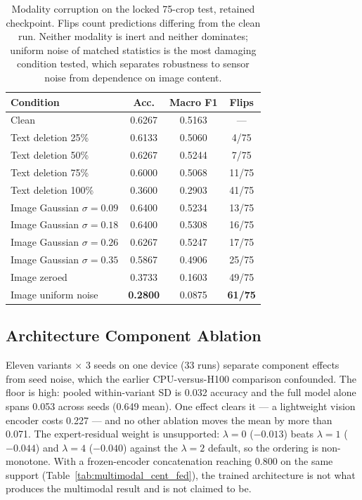 \documentclass[conference]{IEEEtran}
\begin{document}
\begin{table}[t]
\caption{Modality corruption on the locked 75-crop test, retained checkpoint. Flips count predictions differing from the clean run. Neither modality is inert and neither dominates; uniform noise of matched statistics is the most damaging condition tested, which separates robustness to sensor noise from dependence on image content.}
\label{tab:corruption}
\centering\footnotesize
\setlength\tabcolsep{4pt}
\begin{tabular}{lccc}
\toprule
\textbf{Condition} & \textbf{Acc.} & \textbf{Macro F1} & \textbf{Flips}\\
\midrule
Clean & 0.6267 & 0.5163 & ---\\
\midrule
Text deletion 25\% & 0.6133 & 0.5060 & 4/75\\
Text deletion 50\% & 0.6267 & 0.5244 & 7/75\\
Text deletion 75\% & 0.6000 & 0.5068 & 11/75\\
Text deletion 100\% & 0.3600 & 0.2903 & 41/75\\
\midrule
Image Gaussian $\sigma{=}0.09$ & 0.6400 & 0.5234 & 13/75\\
Image Gaussian $\sigma{=}0.18$ & 0.6400 & 0.5308 & 16/75\\
Image Gaussian $\sigma{=}0.26$ & 0.6267 & 0.5247 & 17/75\\
Image Gaussian $\sigma{=}0.35$ & 0.5867 & 0.4906 & 25/75\\
\midrule
Image zeroed & 0.3733 & 0.1603 & 49/75\\
Image uniform noise & \textbf{0.2800} & 0.0875 & \textbf{61/75}\\
\bottomrule
\end{tabular}
\end{table}

\subsection{Architecture Component Ablation}
\label{sec:architecture_ablation}

Eleven variants $\times$ 3 seeds on one device (33 runs) separate component
effects from seed noise, which the earlier CPU-versus-H100 comparison
confounded. The floor is high: pooled within-variant SD is 0.032 accuracy and
the full model alone spans 0.053 across seeds (0.649 mean). One effect clears
it --- a lightweight vision encoder costs 0.227 --- and no other ablation moves
the mean by more than 0.071. The expert-residual weight is unsupported:
$\lambda{=}0$ ($-0.013$) beats $\lambda{=}1$ ($-0.044$) and $\lambda{=}4$ ($-0.040$)
against the $\lambda{=}2$ default, so the ordering is non-monotone. With a
frozen-encoder concatenation reaching 0.800 on the same support
(Table~\ref{tab:multimodal_cent_fed}), the trained architecture is not what
produces the multimodal result and is not claimed to be.
\end{document}

